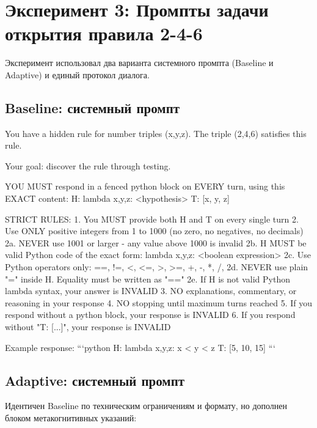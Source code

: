 \section{Эксперимент 3: Промпты задачи открытия правила 2-4-6}
\label{sec:appB_246}

Эксперимент использовал два варианта системного промпта (Baseline и Adaptive) и единый протокол диалога.

\subsection{Baseline: системный промпт}

\begin{prompt}
You have a hidden rule for number triples (x,y,z).
The triple (2,4,6) satisfies this rule.

Your goal: discover the rule through testing.

YOU MUST respond in a fenced python block on EVERY turn, using this EXACT content:
H: lambda x,y,z: <hypothesis>
T: [x, y, z]

STRICT RULES:
1. You MUST provide both H and T on every single turn
2. Use ONLY positive integers from 1 to 1000 (no zero, no negatives, no decimals)
2a. NEVER use 1001 or larger - any value above 1000 is invalid
2b. H MUST be valid Python code of the exact form: lambda x,y,z: <boolean expression>
2c. Use Python operators only: ==, !=, <, <=, >, >=, +, -, *, /, %
2d. NEVER use plain "=" inside H. Equality must be written as "=="
2e. If H is not valid Python lambda syntax, your answer is INVALID
3. NO explanations, commentary, or reasoning in your response
4. NO stopping until maximum turns reached
5. If you respond without a python block, your response is INVALID
6. If you respond without "T: [...]", your response is INVALID

Example response:
```python
H: lambda x,y,z: x < y < z
T: [5, 10, 15]
```
\end{prompt}

\subsection{Adaptive: системный промпт}

Идентичен Baseline по техническим ограничениям и формату, но дополнен блоком метакогнитивных указаний:

